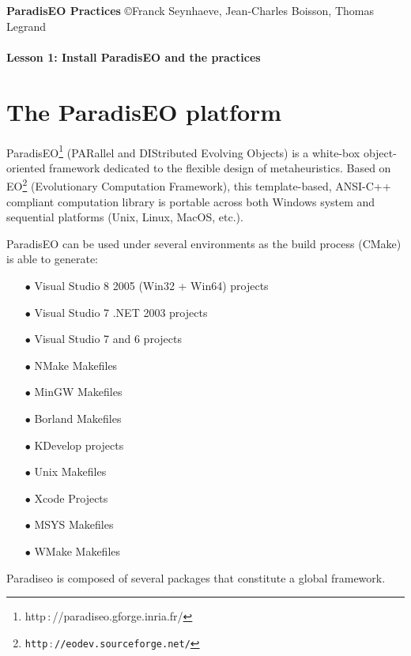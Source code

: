 \documentclass[a4paper]{article}
\begin{document}
\textbf{ParadisEO Practices}  {\copyright Franck Seynhaeve,
Jean-Charles Boisson, Thomas Legrand} \Large{\textbf{\\\\
Lesson 1: Install ParadisEO and the practices}}

\normalsize

 \vspace{-0,3cm}

\section{The ParadisEO platform}

    \medskip

    ParadisEO\footnote{http$\,:$//paradiseo.gforge.inria.fr/} (PARallel and DIStributed Evolving Objects) is a white-box
    object-oriented framework dedicated to the flexible design of metaheuristics.
    Based on EO\footnote{\tt http$\,:$//eodev.sourceforge.net/} (Evolutionary Computation Framework),
    this template-based,
    ANSI-C++ compliant computation library is portable across both Windows
    system and sequential platforms (Unix, Linux, MacOS, etc.).

    \smallskip
    ParadisEO can be used under several environments as the build process (CMake)
    is able to generate:
    \begin{itemize}
       \item[$\bullet$] Visual Studio 8 2005 (Win32 + Win64) projects
           \item[$\bullet$] Visual Studio 7 .NET 2003 projects
           \item[$\bullet$] Visual Studio 7 and 6 projects
           \item[$\bullet$] NMake Makefiles
           \item[$\bullet$] MinGW Makefiles
           \item[$\bullet$] Borland Makefiles
           \item[$\bullet$] KDevelop projects
           \item[$\bullet$] Unix Makefiles
           \item[$\bullet$] Xcode Projects
           \item[$\bullet$] MSYS Makefiles
           \item[$\bullet$] WMake Makefiles
    \end{itemize}

    \smallskip
    Paradiseo is composed of several packages that constitute a global framework.
\end{document}
